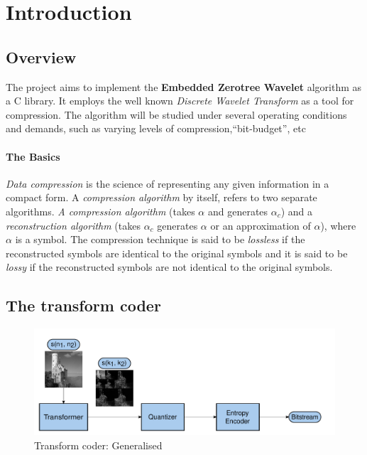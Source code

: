 \documentclass[./A14_Report.tex]{subfiles}
\begin{document}
\chapter{Introduction}
\section{Overview}
\label{sec:overview}

The project aims to implement the \textbf{Embedded Zerotree Wavelet} algorithm
as a C library. It employs the well known \textit{Discrete Wavelet Transform}
as a tool for compression. The algorithm will be studied under several
operating conditions and demands, such as varying levels of
compression,``bit-budget'', etc

\subsubsection{The Basics}%
\label{sec:the_basics}

\textit{Data compression} is the science of representing any given information
in a compact form. A \textit{compression algorithm} by itself, refers to two separate 
algorithms. \textit{A compression algorithm} (takes $\alpha$ and generates $\alpha_c$) 
and a \textit {reconstruction algorithm} (takes $\alpha_c$ generates $\alpha$ or an approximation of $\alpha$), 
where $\alpha$ is a symbol. The compression technique is said 
to be \textit{lossless} if the reconstructed symbols are identical to the original symbols 
and it is said to be \textit{lossy} if the  reconstructed symbols are not identical to the original symbols.

\section{The transform coder}
\label{sec:the_transform_coder}

\begin{figure}[h]
    \centering
    \includegraphics[scale=0.5]{../img/block-diag_shrunk.pdf}
    \caption{Transform coder: Generalised \cite{shap1993}}
    \label{fig:tcoder}
\end{figure}
\end{document}
